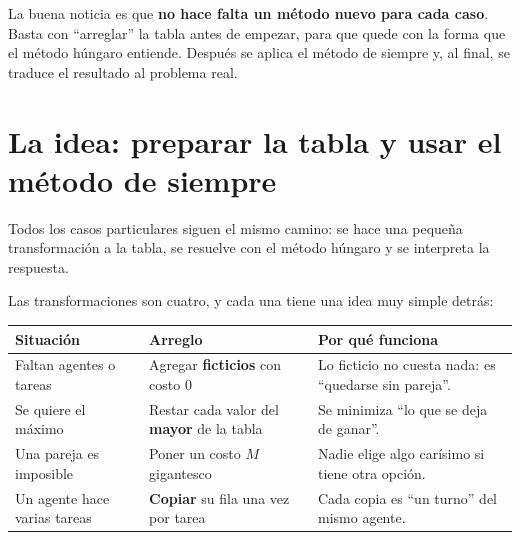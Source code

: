 \documentclass[11pt,a4paper]{article}
\begin{document}
La buena noticia es que \textbf{no hace falta un método nuevo para cada caso}. Basta con ``arreglar'' la tabla
antes de empezar, para que quede con la forma que el método húngaro entiende. Después se aplica el método
de siempre y, al final, se traduce el resultado al problema real.

\section{La idea: preparar la tabla y usar el método de siempre}

Todos los casos particulares siguen el mismo camino: se hace una pequeña transformación a la tabla, se resuelve
con el método húngaro y se interpreta la respuesta.

\begin{center}
\end{center}

Las transformaciones son cuatro, y cada una tiene una idea muy simple detrás:

\begin{center}\small
\begin{tabular}{p{3.6cm}p{5.0cm}p{6.6cm}}
\toprule
\textbf{Situación} & \textbf{Arreglo} & \textbf{Por qué funciona} \\
\midrule
Faltan agentes o tareas & Agregar \textbf{ficticios} con costo 0 & Lo ficticio no cuesta nada: es ``quedarse sin pareja''. \\
Se quiere el máximo & Restar cada valor del \textbf{mayor} de la tabla & Se minimiza ``lo que se deja de ganar''. \\
Una pareja es imposible & Poner un costo $M$ gigantesco & Nadie elige algo carísimo si tiene otra opción. \\
Un agente hace varias tareas & \textbf{Copiar} su fila una vez por tarea & Cada copia es ``un turno'' del mismo agente. \\
\bottomrule
\end{tabular}
\end{center}
\end{document}

